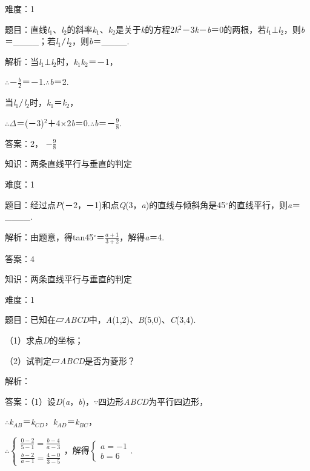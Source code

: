 \documentclass{article} %
\begin{document}
难度：1

题目：直线\textit{l}${}_{1}$、\textit{l}${}_{2}$的斜率\textit{k}${}_{1}$、\textit{k}${}_{2}$是关于\textit{k}的方程2\textit{k}${}^{2}$－3\textit{k}－\textit{b}＝0的两根，若\textit{l}${}_{1}$$\mathrm{\bot}$\textit{l}${}_{2}$，则\textit{b}＝\_\_\_\_；若\textit{l}${}_{1}$$\mathrm{\//}$\textit{l}${}_{2}$，则\textit{b}＝\_\_\_\_.

解析：当\textit{l}${}_{1}$$\mathrm{\bot}$\textit{l}${}_{2}$时，\textit{k}${}_{1}$\textit{k}${}_{2}$＝－1，

$\mathrm{\therefore}$－$\frac{b}{2}$＝－1.$\mathrm{\therefore}$\textit{b}＝2.

当\textit{l}${}_{1}$$\mathrm{\//}$\textit{l}${}_{2}$时，\textit{k}${}_{1}$＝\textit{k}${}_{2}$，

$\mathrm{\therefore}$$\Delta$＝(－3)${}^{2}$＋4$\mathrm{\times}$2\textit{b}＝0.$\mathrm{\therefore}$\textit{b}＝－$\frac{9}{8}$.

答案：2， $-\frac{9}{8}$

知识：两条直线平行与垂直的判定

难度：1

题目：经过点\textit{P}(－2，－1)和点\textit{Q}(3，\textit{a})的直线与倾斜角是45$\mathrm{{}^\circ}$的直线平行，则\textit{a}＝\_\_\_\_.

解析：由题意，得tan45$\mathrm{{}^\circ}$＝$\frac{a+1}{3+2}$，解得\textit{a}＝4.

答案：4

知识：两条直线平行与垂直的判定

难度：1

题目：已知在▱\textit{ABCD}中，\textit{A}(1,2)、\textit{B}(5,0)、\textit{C}(3,4).

（1）求点\textit{D}的坐标；

（2）试判定▱\textit{ABCD}是否为菱形？

解析：

答案：（1）设\textit{D}(\textit{a}，\textit{b})，$\mathrm{\because}$四边形\textit{ABCD}为平行四边形，

$\mathrm{\therefore}$\textit{k${}_{AB}$}＝\textit{k${}_{CD}$}，\textit{k${}_{AD}$}＝\textit{k${}_{BC}$}，

$\mathrm{\therefore}\left\{ \begin{array}{l} \frac{0-2}{5-1}=\frac{b-4}{a-3}\\ \frac{b-2}{a-1}=\frac{4-0}{3-5} \end{array}\right.$，解得$\left\{ \begin{array}{l} a=-1\\	b=6 \end{array}\right.$.
\end{document}
